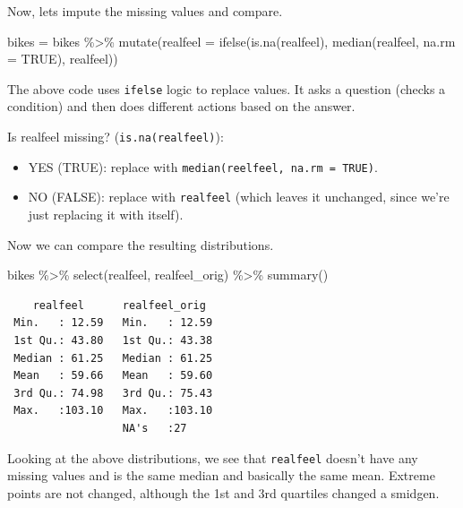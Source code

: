 \documentclass[
  letterpaper,
  DIV=11,
  numbers=noendperiod]{scrartcl}
\newenvironment{Shaded}{\begin{snugshade}}{\end{snugshade}}
\newcommand{\AttributeTok}[1]{\textcolor[rgb]{0.40,0.45,0.13}{#1}}
\newcommand{\ConstantTok}[1]{\textcolor[rgb]{0.56,0.35,0.01}{#1}}
\newcommand{\FunctionTok}[1]{\textcolor[rgb]{0.28,0.35,0.67}{#1}}
\newcommand{\NormalTok}[1]{\textcolor[rgb]{0.00,0.23,0.31}{#1}}
\newcommand{\OtherTok}[1]{\textcolor[rgb]{0.00,0.23,0.31}{#1}}
\newcommand{\SpecialCharTok}[1]{\textcolor[rgb]{0.37,0.37,0.37}{#1}}
\begin{document}
Now, lets impute the missing values and compare.

\begin{Shaded}
\begin{Highlighting}[]
\NormalTok{bikes }\OtherTok{=}\NormalTok{ bikes }\SpecialCharTok{\%\textgreater{}\%}
  \FunctionTok{mutate}\NormalTok{(}\AttributeTok{realfeel =} \FunctionTok{ifelse}\NormalTok{(}\FunctionTok{is.na}\NormalTok{(realfeel),}
                           \FunctionTok{median}\NormalTok{(realfeel, }\AttributeTok{na.rm =} \ConstantTok{TRUE}\NormalTok{),}
\NormalTok{                           realfeel))}
\end{Highlighting}
\end{Shaded}

The above code uses \texttt{ifelse} logic to replace values. It asks a
question (checks a condition) and then does different actions based on
the answer.

Is realfeel missing? (\texttt{is.na(realfeel)}):

\begin{itemize}
\item
  YES (TRUE): replace with \texttt{median(reelfeel,\ na.rm\ =\ TRUE)}.
\item
  NO (FALSE): replace with \texttt{realfeel} (which leaves it unchanged,
  since we're just replacing it with itself).
\end{itemize}

Now we can compare the resulting distributions.

\begin{Shaded}
\begin{Highlighting}[]
\NormalTok{bikes }\SpecialCharTok{\%\textgreater{}\%}
  \FunctionTok{select}\NormalTok{(realfeel, realfeel\_orig) }\SpecialCharTok{\%\textgreater{}\%}
  \FunctionTok{summary}\NormalTok{()}
\end{Highlighting}
\end{Shaded}

\begin{verbatim}
    realfeel      realfeel_orig   
 Min.   : 12.59   Min.   : 12.59  
 1st Qu.: 43.80   1st Qu.: 43.38  
 Median : 61.25   Median : 61.25  
 Mean   : 59.66   Mean   : 59.60  
 3rd Qu.: 74.98   3rd Qu.: 75.43  
 Max.   :103.10   Max.   :103.10  
                  NA's   :27      
\end{verbatim}

Looking at the above distributions, we see that \texttt{realfeel}
doesn't have any missing values and is the same median and basically the
same mean. Extreme points are not changed, although the 1st and 3rd
quartiles changed a smidgen.
\end{document}
